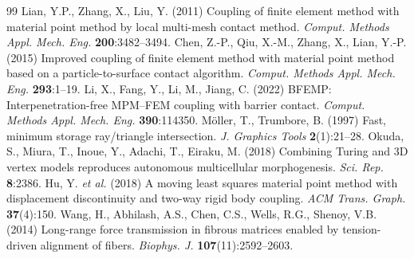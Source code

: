 \documentclass[10pt,a4paper]{article}
\begin{document}
{\small
\begin{thebibliography}{99}\setlength{\itemsep}{0pt}
 Lian, Y.P., Zhang, X., Liu, Y. (2011) Coupling of finite element method with
material point method by local multi-mesh contact method. \emph{Comput. Methods Appl. Mech. Eng.}
\textbf{200}:3482--3494.
 Chen, Z.-P., Qiu, X.-M., Zhang, X., Lian, Y.-P. (2015) Improved coupling of finite
element method with material point method based on a particle-to-surface contact algorithm.
\emph{Comput. Methods Appl. Mech. Eng.} \textbf{293}:1--19.
 Li, X., Fang, Y., Li, M., Jiang, C. (2022) BFEMP: Interpenetration-free MPM--FEM
coupling with barrier contact. \emph{Comput. Methods Appl. Mech. Eng.} \textbf{390}:114350.
 M\"oller, T., Trumbore, B. (1997) Fast, minimum storage ray/triangle
intersection. \emph{J. Graphics Tools} \textbf{2}(1):21--28.
 Okuda, S., Miura, T., Inoue, Y., Adachi, T., Eiraku, M. (2018) Combining Turing
and 3D vertex models reproduces autonomous multicellular morphogenesis. \emph{Sci. Rep.} \textbf{8}:2386.
 Hu, Y. \emph{et al.} (2018) A moving least squares material point method with
displacement discontinuity and two-way rigid body coupling. \emph{ACM Trans. Graph.} \textbf{37}(4):150.
 Wang, H., Abhilash, A.S., Chen, C.S., Wells, R.G., Shenoy, V.B. (2014) Long-range
force transmission in fibrous matrices enabled by tension-driven alignment of fibers.
\emph{Biophys. J.} \textbf{107}(11):2592--2603.
\end{thebibliography}}
\end{document}
